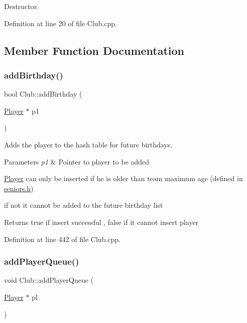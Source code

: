 Destructor. 



Definition at line 20 of file Club.\+cpp.



\subsection{Member Function Documentation}
\hypertarget{class_club_a085dd799d98de3efc6e43d81718f54a3}{}\label{class_club_a085dd799d98de3efc6e43d81718f54a3} 
\subsubsection{\texorpdfstring{add\+Birthday()}{addBirthday()}}
{\footnotesize\ttfamily bool Club\+::add\+Birthday (\begin{DoxyParamCaption}\item[{\hyperlink{class_player}{Player} $\ast$}]{p1 }\end{DoxyParamCaption})}



Adds the player to the hash table for future birthdays. 


\begin{DoxyParams}{Parameters}
{\em p1} & Pointer to player to be added\\
\hline
\end{DoxyParams}
\hyperlink{class_player}{Player} can only be inserted if he is older than team maximum age (defined in \hyperlink{_seniors_8h}{seniors.\+h})

if not it cannot be added to the future birthday list

\begin{DoxyReturn}{Returns}
true if insert successful , false if it cannot insert player 
\end{DoxyReturn}


Definition at line 442 of file Club.\+cpp.

\hypertarget{class_club_aecaa2826d91ec8efdc8b8ecc5543f9d0}{}\label{class_club_aecaa2826d91ec8efdc8b8ecc5543f9d0} 
\subsubsection{\texorpdfstring{add\+Player\+Queue()}{addPlayerQueue()}}
{\footnotesize\ttfamily void Club\+::add\+Player\+Queue (\begin{DoxyParamCaption}\item[{\hyperlink{class_player}{Player} $\ast$}]{pl }\end{DoxyParamCaption})}




